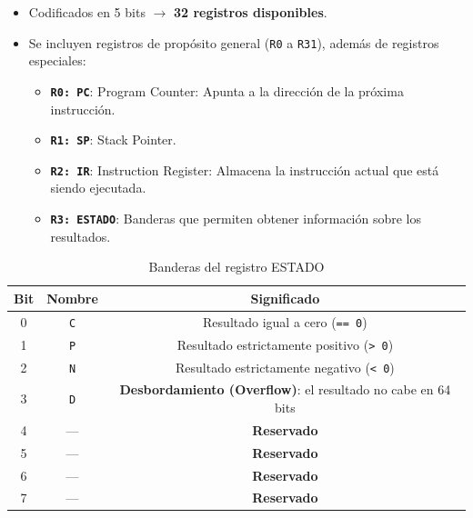 \documentclass{article}
\begin{document}
\begin{itemize}
  \item Codificados en 5 bits $\rightarrow$ \textbf{32 registros disponibles}.
  \item Se incluyen registros de propósito general (\texttt{R0} a \texttt{R31}), además de registros especiales:
        \begin{itemize}
          \item \textbf{\texttt{R0: PC}}: Program Counter: Apunta a la dirección de la próxima instrucción.
          \item \textbf{\texttt{R1: SP}}: Stack Pointer.
          \item \textbf{\texttt{R2: IR}}: Instruction Register: Almacena la instrucción actual que está siendo ejecutada.
          \item \textbf{\texttt{R3: ESTADO}}: Banderas que permiten obtener información sobre los resultados.
        \end{itemize}
\end{itemize}

\begin{table}[H]
  \centering
  \begin{tabular}{|c|c|c|}
    \hline
    \textbf{Bit} & \textbf{Nombre} & \textbf{Significado}                                                \\
    \hline
    0            & \texttt{C}      & Resultado igual a cero (\texttt{== 0})                              \\
    1            & \texttt{P}      & Resultado estrictamente positivo (\texttt{> 0})                     \\
    2            & \texttt{N}      & Resultado estrictamente negativo (\texttt{< 0})                     \\
    3            & \texttt{D}      & \textbf{Desbordamiento (Overflow)}: el resultado no cabe en 64 bits \\
    4            & —               & \textbf{Reservado}                                                  \\
    5            & —               & \textbf{Reservado}                                                  \\
    6            & —               & \textbf{Reservado}                                                  \\
    7            & —               & \textbf{Reservado}                                                  \\
    \hline
  \end{tabular}
  \caption{Banderas del registro ESTADO}
\end{table}
\end{document}
